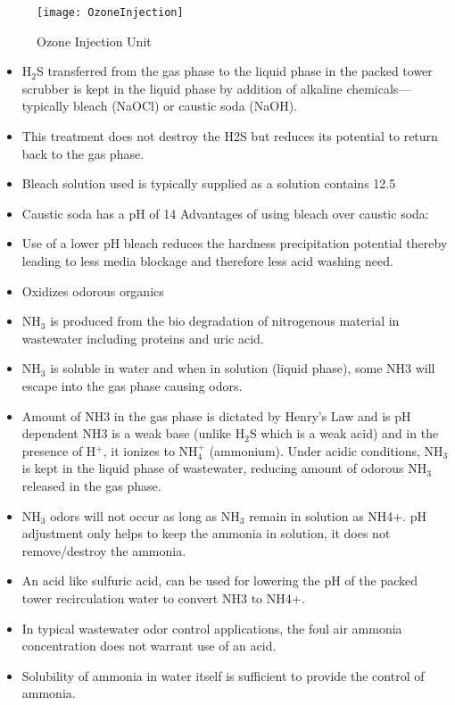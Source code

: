 \begin{figure}[htp]
	\begin{center}
		\texttt{[image: OzoneInjection]}
			\caption{Ozone Injection Unit}
	\end{center}
	
	\end{figure}

\begin{itemize}
\item H$_2$S transferred from the gas phase to the liquid phase in the packed tower scrubber is kept in the liquid phase by addition of alkaline chemicals—typically bleach (NaOCl) or caustic soda (NaOH).
\item This treatment does not destroy the H2S but reduces its potential to return back to the gas phase.
\item Bleach solution used is typically supplied as a solution contains 12.5%
\item Caustic soda has a pH of 14
Advantages of using bleach over caustic soda:
\item Use of a lower pH bleach reduces the hardness precipitation potential thereby leading to less media blockage and therefore less acid washing need.
\item Oxidizes odorous organics
\end{itemize}

\begin{itemize}
\item NH$_3$ is produced from the bio degradation of nitrogenous material in wastewater including proteins and uric acid.
\item NH$_3$ is soluble in water and when in solution (liquid phase), some NH3 will escape into the gas phase causing odors.
\item Amount of NH3 in the gas phase is dictated by Henry’s Law and is pH dependent
NH3 is a weak base (unlike H$_2$S which is a weak acid) and in the presence of H$^+$, it ionizes to NH$_4^+$ (ammonium).
Under acidic conditions, NH$_3$ is kept in the liquid phase of wastewater, reducing amount of odorous NH$_3$  released in the gas phase.
\item NH$_3$ odors will not occur as long as NH$_3$ remain in solution as NH4+.
pH adjustment only helps to keep the ammonia in solution, it does not remove/destroy the ammonia.
\end{itemize}

\begin{itemize}
\item An acid like sulfuric acid, can be used for lowering the pH of the packed tower recirculation water to convert NH3 to NH4+.
\item In typical wastewater odor control applications, the foul air ammonia concentration does not warrant use of an acid.
\item Solubility of ammonia in water itself is sufficient to provide the control of ammonia.
\end{itemize}

